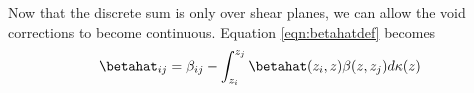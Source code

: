 Now that the discrete sum is only over shear planes, we can allow the void corrections to become continuous. Equation \ref{eqn:betahatdef} becomes
\begin{equation}
\label{eqn:betaint}
\betahat_{i j} = \beta_{ i j} - \int_{z_i}^{z_j} \betahat(z_i, z) \beta(z, z_j) d\kappa(z)
\end{equation}
  
  